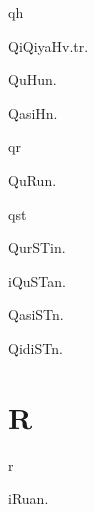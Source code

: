 \begin{multicols*}{2}
\begin{dictroot}{q}{h}
\begin{dictentry}{QiQiyaH}{v.tr.}
{        }
    \end{dictentry}
    \begin{dictentry}{QuHu}{n.}
    \end{dictentry}
    \begin{dictentry}{QasiH}{n.}
    \end{dictentry}
\end{dictroot}

\begin{dictroot}{q}{r}
    \begin{dictentry}{QuRu}{n.}
    \end{dictentry}
\end{dictroot}

\begin{dictroot}{q}{st}
    \begin{dictentry}{QurSTi}{n.}
    \end{dictentry}
    \begin{dictentry}{iQuSTa}{n.}
    \end{dictentry}
    \begin{dictentry}{QasiST}{n.}
    \end{dictentry}
    \begin{dictentry}{QidiST}{n.}
    \end{dictentry}
\end{dictroot}

\section*{R}

\begin{dictroot}{r}{\bigglot}
    \begin{dictentry}{iRu{\bigglot}a}{n.}
    \end{dictentry}
\end{dictroot}


\end{multicols*}
